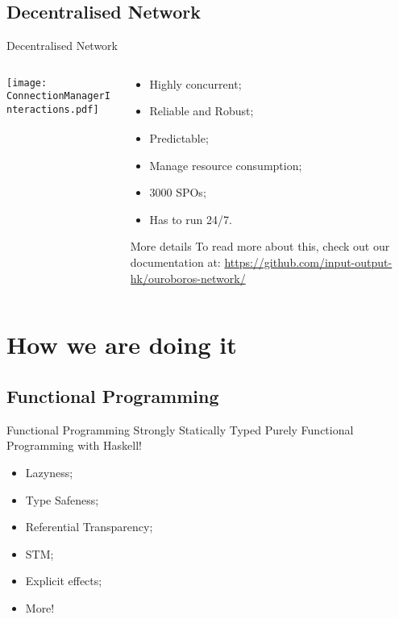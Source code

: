 \documentclass{beamer}
\begin{document}
\subsection*{Decentralised Network}
\begin{frame}{Decentralised Network }
  \begin{columns}
    \begin{column}{0.6\textwidth}
      \vskip0.2cm
      \texttt{[image: ConnectionManagerInteractions.pdf]}
    \end{column}
    \begin{column}{0.4\textwidth}
      \footnotesize
      \begin{itemize}
        \item Highly concurrent;
        \item Reliable and Robust;
        \item Predictable;
        \item Manage resource consumption;
        \item 3000 SPOs;
        \item Has to run 24/7.
      \end{itemize}

      \tiny
      \begin{block}{More details}
        To read more about this, check out our documentation at:
        \href{https://github.com/input-output-hk/ouroboros-network/}{https://github.com/input-output-hk/ouroboros-network/}
      \end{block}

    \end{column}
  \end{columns}
\end{frame}

\section{How we are doing it}

\subsection*{Functional Programming}

\begin{frame}{Functional Programming}
  Strongly Statically Typed Purely Functional Programming with \alert{Haskell}!

  \begin{itemize}
      \item Lazyness;
      \item \alert{Type Safeness};
      \item \alert{Referential Transparency};
      \item \alert{STM};
      \item Explicit effects;
      \item More!
  \end{itemize}

\end{frame}
\end{document}
